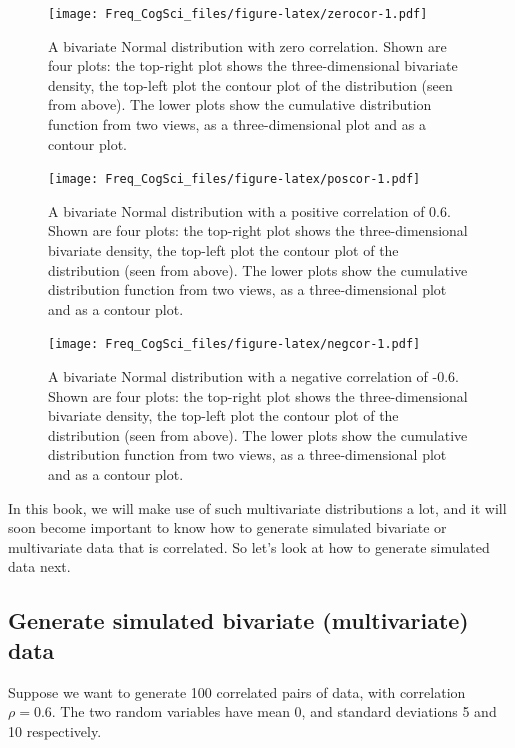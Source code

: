 \documentclass[12pt,]{krantz}
\begin{document}
\begin{figure}
\centering
\texttt{[image: Freq\_CogSci\_files/figure-latex/zerocor-1.pdf]}
\caption{\label{fig:zerocor}A bivariate Normal distribution with zero correlation. Shown are four plots: the top-right plot shows the three-dimensional bivariate density, the top-left plot the contour plot of the distribution (seen from above). The lower plots show the cumulative distribution function from two views, as a three-dimensional plot and as a contour plot.}
\end{figure}

\begin{figure}
\centering
\texttt{[image: Freq\_CogSci\_files/figure-latex/poscor-1.pdf]}
\caption{\label{fig:poscor}A bivariate Normal distribution with a positive correlation of 0.6. Shown are four plots: the top-right plot shows the three-dimensional bivariate density, the top-left plot the contour plot of the distribution (seen from above). The lower plots show the cumulative distribution function from two views, as a three-dimensional plot and as a contour plot.}
\end{figure}

\begin{figure}
\centering
\texttt{[image: Freq\_CogSci\_files/figure-latex/negcor-1.pdf]}
\caption{\label{fig:negcor}A bivariate Normal distribution with a negative correlation of -0.6. Shown are four plots: the top-right plot shows the three-dimensional bivariate density, the top-left plot the contour plot of the distribution (seen from above). The lower plots show the cumulative distribution function from two views, as a three-dimensional plot and as a contour plot.}
\end{figure}

In this book, we will make use of such multivariate distributions a lot, and it will soon become important to know how to generate simulated bivariate or multivariate data that is correlated. So let's look at how to generate simulated data next.

\hypertarget{generate-simulated-bivariate-multivariate-data}{%
\subsection{Generate simulated bivariate (multivariate) data}\label{generate-simulated-bivariate-multivariate-data}}

Suppose we want to generate 100 correlated pairs of data, with correlation \(\rho=0.6\). The two random variables have mean 0, and standard deviations 5 and 10 respectively.
\end{document}
